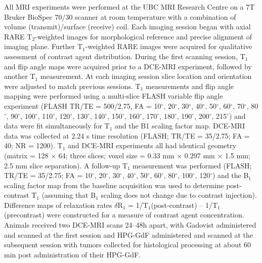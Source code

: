 All MRI experiments were performed at the UBC MRI Research Centre on a 7T Bruker BioSpec 70/30 scanner at room temperature with a combination of volume (transmit)/surface (receive) coil.
Each imaging session began with axial RARE T$_2$-weighted images for morphological reference and precise alignment of imaging plane.
Further T$_1$-weighted RARE images were acquired for qualitative assessment of contrast agent distribution.
During the first scanning session, T$_1$ and flip angle maps were acquired prior to a DCE-MRI experiment, followed by another T$_1$ measurement.
At each imaging session slice location and orientation were adjusted to match previous sessions.
T$_1$ measurements and flip angle mapping were performed using a multi-slice FLASH variable flip angle experiment (FLASH TR/TE = 500/2.75, FA = 10$^{\circ}$, 20$^{\circ}$, 30$^{\circ}$, 40$^{\circ}$, 50$^{\circ}$, 60$^{\circ}$, 70$^{\circ}$, 80$^{\circ}$, 90$^{\circ}$, 100$^{\circ}$, 110$^{\circ}$, 120$^{\circ}$, 130$^{\circ}$, 140$^{\circ}$, 150$^{\circ}$, 160$^{\circ}$, 170$^{\circ}$, 180$^{\circ}$, 190$^{\circ}$, 200$^{\circ}$, 215$^{\circ}$) and data were fit simultaneously for T$_1$ and the B1 scaling factor map.
DCE-MRI data was collected at 2.24 s time resolution (FLASH; TR/TE = 35/2.75; FA = 40; NR = 1200).
T$_1$ and DCE-MRI experiments all had identical geometry (matrix = 128 × 64; three slices; voxel size = 0.33 mm × 0.297 mm × 1.5 mm; 2.5 mm slice separation).
A follow-up T$_1$ measurement was performed (FLASH; TR/TE = 35/2.75; FA = 10$^{\circ}$, 20$^{\circ}$, 30$^{\circ}$, 40$^{\circ}$, 50$^{\circ}$, 60$^{\circ}$, 80$^{\circ}$, 100$^{\circ}$, 120$^{\circ}$) and the B$_1$ scaling factor map from the baseline acquisition was used to determine post-contrast T$_1$ (assuming that B$_1$ scaling does not change due to contrast injection).
Difference maps of relaxation rates $\delta$R$_1$ = 1/T$_1$(post-contrast) – 1/T$_1$(precontrast) were constructed for a measure of contrast agent concentration.
Animals received two DCE-MRI scans 24–48h apart, with Gadovist administered and scanned at the first session and HPG-GdF administered and scanned at the subsequent session with tumors collected for histological processing at about 60 min post administration of their HPG-GdF.

